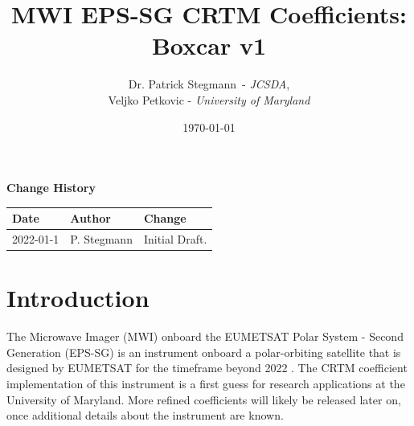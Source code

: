 

\title{MWI EPS-SG CRTM Coefficients: Boxcar v1}
\author{Dr. Patrick Stegmann\ - \emph{JCSDA},\\ Veljko Petkovic - \emph{University of Maryland}}
\date{\today}




\maketitle

\draftwatermark

\tableofcontents

\newpage

\thispagestyle{empty}
\vspace*{10cm}
\begin{center}
  {\sffamily\Large\bfseries Change History}
  \begin{table}[htp]
    \centering
    \begin{tabular}{|p{2cm}|p{3cm}|p{8cm}|}
      \hline
      \sffamily\textbf{Date} & \sffamily\textbf{Author} & \sffamily\textbf{Change}\\
      \hline\hline
      2022-01-1 & P. Stegmann& Initial Draft.\\
      \hline
    \end{tabular}
  \end{table}
\end{center}
\clearpage
{}
\setcounter{page}{1}


%

\section{Introduction}
The Microwave Imager (MWI) onboard the EUMETSAT Polar System - Second Generation (EPS-SG) is an instrument onboard a polar-orbiting satellite that is designed by EUMETSAT for the timeframe beyond 2022 \cite{mwi}.
The CRTM coefficient implementation of this instrument is a first guess for research applications at the University of Maryland. More refined coefficients will likely be released later on, once additional details about the instrument are known.

